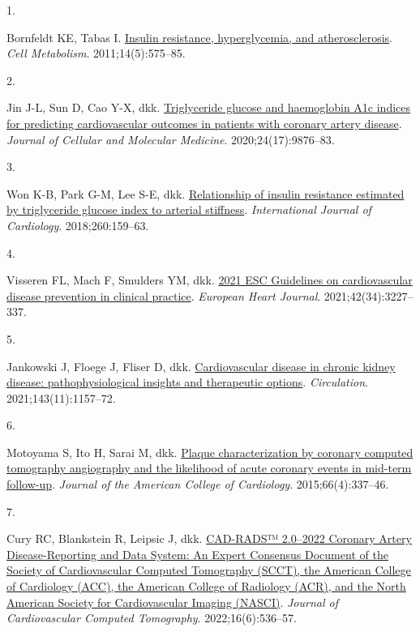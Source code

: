 \documentclass[
  indonesian,
]{agujournal2019}
\newlength{\cslhangindent}
\newlength{\csllabelwidth}
\newenvironment{CSLReferences}[2] %
 {\begin{list}{}{%
  \setlength{\itemindent}{0pt}
  \setlength{\leftmargin}{0pt}
  \setlength{\parsep}{0pt}
  \ifodd #1
   \setlength{\leftmargin}{\cslhangindent}
   \setlength{\itemindent}{-1\cslhangindent}
  \fi
  \setlength{\itemsep}{#2\baselineskip}}}
 {\end{list}}
\newcommand{\CSLLeftMargin}[1]{\parbox[t]{\csllabelwidth}{\strut#1\strut}}
\newcommand{\CSLRightInline}[1]{\parbox[t]{\linewidth - \csllabelwidth}{\strut#1\strut}}
\begin{document}
\protect{}\label{refs}
\begin{CSLReferences}{0}{1}
\vspace{1em}

\CSLLeftMargin{1. }%
\CSLRightInline{Bornfeldt KE, Tabas I.
\href{https://doi.org/10.1016/j.cmet.2011.07.015}{Insulin resistance,
hyperglycemia, and atherosclerosis}. \emph{Cell Metabolism}.
2011;14(5):575--85. }

\CSLLeftMargin{2. }%
\CSLRightInline{{Jin J-L, Sun D, Cao Y-X, dkk.}
\href{https://doi.org/10.1111/jcmm.15579}{Triglyceride glucose and
haemoglobin A1c indices for predicting cardiovascular outcomes in
patients with coronary artery disease}. \emph{Journal of Cellular and
Molecular Medicine}. 2020;24(17):9876--83. }

\CSLLeftMargin{3. }%
\CSLRightInline{{Won K-B, Park G-M, Lee S-E, dkk.}
\href{https://doi.org/10.1016/j.ijcard.2018.02.100}{Relationship of
insulin resistance estimated by triglyceride glucose index to arterial
stiffness}. \emph{International Journal of Cardiology}.
2018;260:159--63. }

\CSLLeftMargin{4. }%
\CSLRightInline{{Visseren FL, Mach F, Smulders YM, dkk.}
\href{https://doi.org/10.1093/eurheartj/ehab484}{2021 ESC Guidelines on
cardiovascular disease prevention in clinical practice}. \emph{European
Heart Journal}. 2021;42(34):3227--337. }

\CSLLeftMargin{5. }%
\CSLRightInline{Jankowski J, Floege J, Fliser D, dkk.
\href{https://doi.org/10.1161/CIRCULATIONAHA.120.050686}{Cardiovascular
disease in chronic kidney disease: pathophysiological insights and
therapeutic options}. \emph{Circulation}. 2021;143(11):1157--72. }

\CSLLeftMargin{6. }%
\CSLRightInline{{Motoyama S, Ito H, Sarai M, dkk.}
\href{https://doi.org/10.1016/j.jacc.2015.05.069}{Plaque
characterization by coronary computed tomography angiography and the
likelihood of acute coronary events in mid-term follow-up}.
\emph{Journal of the American College of Cardiology}.
2015;66(4):337--46. }

\CSLLeftMargin{7. }%
\CSLRightInline{{Cury RC, Blankstein R, Leipsic J, dkk.}
\href{https://doi.org/10.1016/j.jcct.2022.07.002}{CAD-RADS™ 2.0--2022
Coronary Artery Disease-Reporting and Data System: An Expert Consensus
Document of the Society of Cardiovascular Computed Tomography (SCCT),
the American College of Cardiology (ACC), the American College of
Radiology (ACR), and the North American Society for Cardiovascular
Imaging (NASCI)}. \emph{Journal of Cardiovascular Computed Tomography}.
2022;16(6):536--57. }


\end{CSLReferences}
\end{document}
